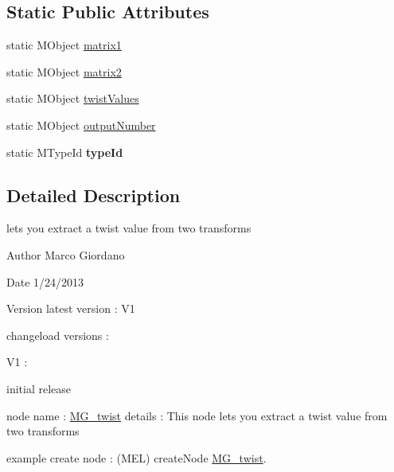 \subsection*{Static Public Attributes}
\begin{DoxyCompactItemize}
\item 
static M\-Object \hyperlink{class_m_g__twist_a1f56e50333669ce2a38f71e3226ab18e}{matrix1}
\item 
static M\-Object \hyperlink{class_m_g__twist_a529b723501fff0dd68b7062a8816195b}{matrix2}
\item 
static M\-Object \hyperlink{class_m_g__twist_a112610270816a7e39e633a779f3f6f49}{twist\-Values}
\item 
static M\-Object \hyperlink{class_m_g__twist_a91ee2296147fba36025cc06ec0ed9db1}{output\-Number}
\item 
\hypertarget{class_m_g__twist_a79fb6cae99e39340484b4434f1fd9e70}{static M\-Type\-Id {\bfseries type\-Id}}\label{class_m_g__twist_a79fb6cae99e39340484b4434f1fd9e70}

\end{DoxyCompactItemize}


\subsection{Detailed Description}
lets you extract a twist value from two transforms 

\begin{DoxyAuthor}{Author}
Marco Giordano 
\end{DoxyAuthor}
\begin{DoxyDate}{Date}
1/24/2013 
\end{DoxyDate}
\begin{DoxyVersion}{Version}
latest version \-: V1 

changeload versions \-: \par
 V1 \-: \par

\begin{DoxyItemize}
\item initial release \par

\end{DoxyItemize}
\end{DoxyVersion}
node name \-: \hyperlink{class_m_g__twist}{M\-G\-\_\-twist} details \-: This node lets you extract a twist value from two transforms

example create node \-: (M\-E\-L) create\-Node \hyperlink{class_m_g__twist}{M\-G\-\_\-twist}. 

